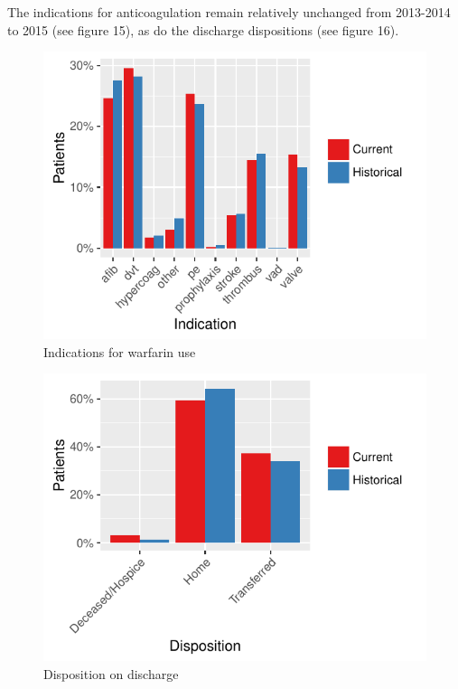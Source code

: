 \documentclass[]{article}
\begin{document}
The indications for anticoagulation remain relatively unchanged from
2013-2014 to 2015 (see figure 15), as do the discharge dispositions (see
figure 16).

\begin{figure}[H]
\centering
\includegraphics{warfarin_analysis_2015_files/figure-latex/indications_hist-1.pdf}
\caption{Indications for warfarin use}
\end{figure}

\begin{figure}[H]
\centering
\includegraphics{warfarin_analysis_2015_files/figure-latex/disposition_hist-1.pdf}
\caption{Disposition on discharge}
\end{figure}
\end{document}
